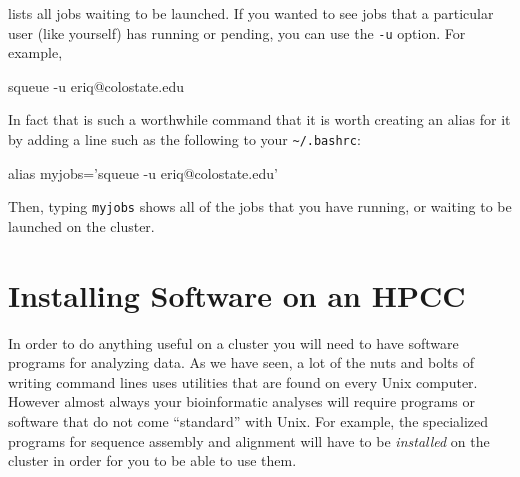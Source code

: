 \documentclass[]{krantz}
\makeatletter
\newenvironment{Shaded}{\begin{snugshade}}{\end{snugshade}}
\newcommand{\BuiltInTok}[1]{#1}
\newcommand{\ExtensionTok}[1]{#1}
\newcommand{\NormalTok}[1]{#1}
\newcommand{\StringTok}[1]{\textcolor[rgb]{0.5,0.5,0.5}{#1}}
\newenvironment{kframe}{%
\medskip{}
\setlength{\fboxsep}{.8em}
 \def\at@end@of@kframe{}%
 \ifinner\ifhmode%
  \def\at@end@of@kframe{\end{minipage}}%
  \begin{minipage}{\columnwidth}%
 \fi\fi%
 \def\FrameCommand##1{\hskip\@totalleftmargin \hskip-\fboxsep
 \colorbox{shadecolor}{##1}\hskip-\fboxsep
     \hskip-\linewidth \hskip-\@totalleftmargin \hskip\columnwidth}%
 \MakeFramed {\advance\hsize-\width
   \@totalleftmargin\z@ \linewidth\hsize
   \@setminipage}}%
 {\par\unskip\endMakeFramed%
 \at@end@of@kframe}
\renewenvironment{Shaded}{\begin{kframe}}{\end{kframe}}
\makeatother
\begin{document}
lists all jobs waiting to be launched. If you wanted to see jobs that a particular
user (like yourself) has running or pending, you can use the \texttt{-u} option. For example,

\begin{Shaded}
\begin{Highlighting}[]
\ExtensionTok{squeue}\NormalTok{ -u eriq@colostate.edu}
\end{Highlighting}
\end{Shaded}

In fact that is such a worthwhile command that it is worth creating an alias
for it by adding a line such as the following to your \texttt{\textasciitilde{}/.bashrc}:

\begin{Shaded}
\begin{Highlighting}[]
\BuiltInTok{alias}\NormalTok{ myjobs=}\StringTok{'squeue -u eriq@colostate.edu'}
\end{Highlighting}
\end{Shaded}

Then, typing \texttt{myjobs} shows all of the jobs that you have running, or waiting to be launched
on the cluster.

\hypertarget{installing-software-on-an-hpcc}{%
\section{Installing Software on an HPCC}\label{installing-software-on-an-hpcc}}

In order to do anything useful on a cluster you will need to have software programs
for analyzing data. As we have seen, a lot of the nuts and bolts of writing command
lines uses utilities that are found on every Unix computer. However almost always
your bioinformatic analyses will require programs or software that
do not come ``standard'' with Unix. For example, the specialized programs for
sequence assembly and alignment will have to be \emph{installed} on the cluster
in order for you to be able to use them.
\end{document}
